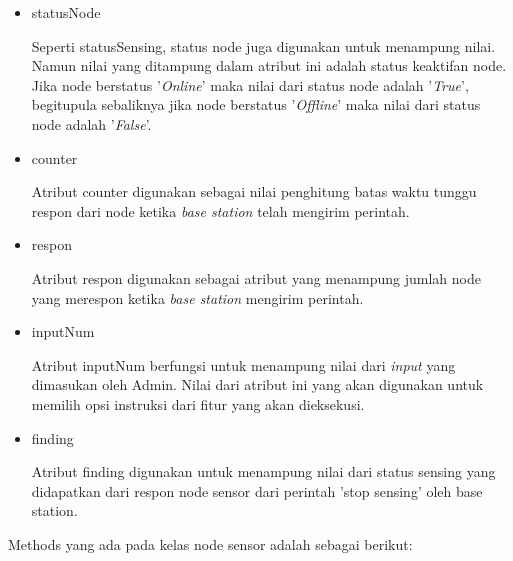 \begin{itemize}
        
        \item statusNode
        
        Seperti statusSensing, status node juga digunakan untuk menampung nilai. Namun nilai yang ditampung dalam atribut ini adalah status keaktifan node. Jika node berstatus '\textit{Online}' maka nilai dari status node adalah '\textit{True}', begitupula sebaliknya jika node berstatus '\textit{Offline}' maka nilai dari status node adalah '\textit{False}'.
        
        \item counter
        
        Atribut counter digunakan sebagai nilai penghitung batas waktu tunggu respon dari node ketika \textit{base station} telah mengirim perintah.
        
        \item respon
        
        Atribut respon digunakan sebagai atribut yang menampung jumlah node yang merespon ketika \textit{base station} mengirim perintah.
        
        \item inputNum
        
        Atribut inputNum berfungsi untuk menampung nilai dari \textit{input} yang dimasukan oleh Admin. Nilai dari atribut ini yang akan digunakan untuk memilih opsi instruksi dari fitur yang akan dieksekusi.
        
        \item finding
        
        Atribut finding digunakan untuk menampung nilai dari status sensing yang didapatkan dari respon node sensor dari perintah 'stop sensing' oleh base station. 
        

    \end{itemize}
    
    Methods yang ada pada kelas node sensor adalah sebagai berikut:
    
